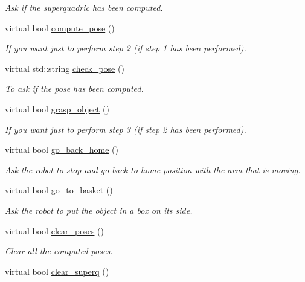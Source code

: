\begin{DoxyCompactItemize}
\begin{DoxyCompactList}\small\item\em Ask if the superquadric has been computed. \end{DoxyCompactList}\item 
virtual bool \hyperlink{classgraspDemo__IDL_aa3bc2e6efe297a22d3df556ca63103bd}{compute\+\_\+pose} ()
\begin{DoxyCompactList}\small\item\em If you want just to perform step 2 (if step 1 has been performed). \end{DoxyCompactList}\item 
virtual std\+::string \hyperlink{classgraspDemo__IDL_a2e6cb4a651443ccbd63999eeaf10d5e7}{check\+\_\+pose} ()
\begin{DoxyCompactList}\small\item\em To ask if the pose has been computed. \end{DoxyCompactList}\item 
virtual bool \hyperlink{classgraspDemo__IDL_aec86f807d6baf8ab6b8bd5f321225c95}{grasp\+\_\+object} ()
\begin{DoxyCompactList}\small\item\em If you want just to perform step 3 (if step 2 has been performed). \end{DoxyCompactList}\item 
virtual bool \hyperlink{classgraspDemo__IDL_a7fbe57e4cfca528567a8d84a659b8f12}{go\+\_\+back\+\_\+home} ()
\begin{DoxyCompactList}\small\item\em Ask the robot to stop and go back to home position with the arm that is moving. \end{DoxyCompactList}\item 
virtual bool \hyperlink{classgraspDemo__IDL_a18069fb03cae17d4e09a52adfcd06a09}{go\+\_\+to\+\_\+basket} ()
\begin{DoxyCompactList}\small\item\em Ask the robot to put the object in a box on its side. \end{DoxyCompactList}\item 
virtual bool \hyperlink{classgraspDemo__IDL_af81380d0426728f5288afb35a0087891}{clear\+\_\+poses} ()
\begin{DoxyCompactList}\small\item\em Clear all the computed poses. \end{DoxyCompactList}\item 
virtual bool \hyperlink{classgraspDemo__IDL_affd8c910d151bb08d4c97626f7b6c508}{clear\+\_\+superq} ()

\end{DoxyCompactItemize}
